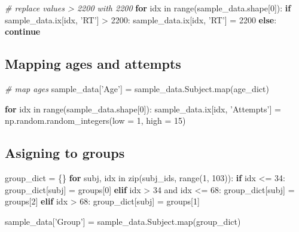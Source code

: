 \documentclass[]{article}
\newenvironment{Shaded}{\begin{snugshade}}{\end{snugshade}}
\newcommand{\KeywordTok}[1]{\textcolor[rgb]{0.13,0.29,0.53}{\textbf{{#1}}}}
\newcommand{\DataTypeTok}[1]{\textcolor[rgb]{0.13,0.29,0.53}{{#1}}}
\newcommand{\DecValTok}[1]{\textcolor[rgb]{0.00,0.00,0.81}{{#1}}}
\newcommand{\StringTok}[1]{\textcolor[rgb]{0.31,0.60,0.02}{{#1}}}
\newcommand{\CommentTok}[1]{\textcolor[rgb]{0.56,0.35,0.01}{\textit{{#1}}}}
\newcommand{\NormalTok}[1]{{#1}}
\begin{document}
\begin{Shaded}
\begin{Highlighting}[]
\CommentTok{# replace values > 2200 with 2200}
\KeywordTok{for} \NormalTok{idx in }\DataTypeTok{range}\NormalTok{(sample_data.shape[}\DecValTok{0}\NormalTok{]):}
    \KeywordTok{if} \NormalTok{sample_data.ix[idx, }\StringTok{'RT'}\NormalTok{] > }\DecValTok{2200}\NormalTok{:}
        \NormalTok{sample_data.ix[idx, }\StringTok{'RT'}\NormalTok{] = }\DecValTok{2200}
    \KeywordTok{else}\NormalTok{:}
        \KeywordTok{continue}
\end{Highlighting}
\end{Shaded}

\subsection{Mapping ages and attempts}\label{mapping-ages-and-attempts}

\begin{Shaded}
\begin{Highlighting}[]

\CommentTok{# map ages}
\NormalTok{sample_data[}\StringTok{'Age'}\NormalTok{] = sample_data.Subject.}\DataTypeTok{map}\NormalTok{(age_dict)}

\KeywordTok{for} \NormalTok{idx in }\DataTypeTok{range}\NormalTok{(sample_data.shape[}\DecValTok{0}\NormalTok{]):}
    \NormalTok{sample_data.ix[idx, }\StringTok{'Attempts'}\NormalTok{] = np.random.random_integers(low = }\DecValTok{1}\NormalTok{, high = }\DecValTok{15}\NormalTok{)}
\end{Highlighting}
\end{Shaded}

\subsection{Asigning to groups}\label{asigning-to-groups}

\begin{Shaded}
\begin{Highlighting}[]

\NormalTok{group_dict = \{\}}
\KeywordTok{for} \NormalTok{subj, idx in }\DataTypeTok{zip}\NormalTok{(subj_ids, }\DataTypeTok{range}\NormalTok{(}\DecValTok{1}\NormalTok{, }\DecValTok{103}\NormalTok{)):}
    \KeywordTok{if} \NormalTok{idx <= }\DecValTok{34}\NormalTok{:}
        \NormalTok{group_dict[subj] = groups[}\DecValTok{0}\NormalTok{]}
    \KeywordTok{elif} \NormalTok{idx > }\DecValTok{34} \NormalTok{and idx <= }\DecValTok{68}\NormalTok{:}
        \NormalTok{group_dict[subj] = groups[}\DecValTok{2}\NormalTok{]}
    \KeywordTok{elif} \NormalTok{idx > }\DecValTok{68}\NormalTok{:}
        \NormalTok{group_dict[subj] = groups[}\DecValTok{1}\NormalTok{]}

\NormalTok{sample_data[}\StringTok{'Group'}\NormalTok{] = sample_data.Subject.}\DataTypeTok{map}\NormalTok{(group_dict)}
\end{Highlighting}
\end{Shaded}
\end{document}
